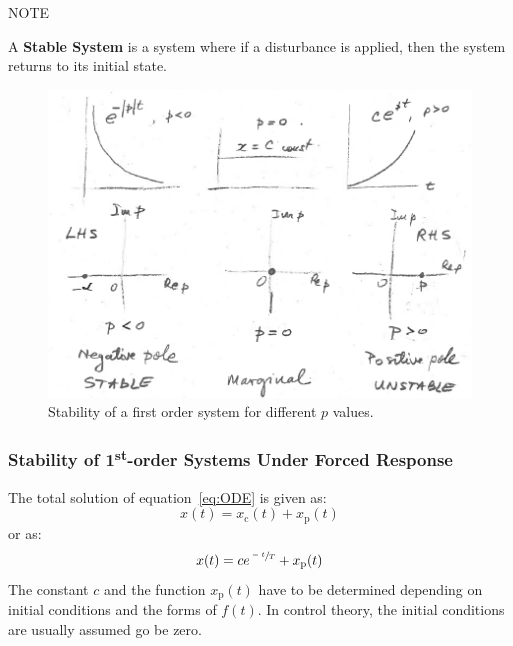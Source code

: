 \documentclass[12pt,letter]{article}
\numberwithin{ex}{section} %
\numberwithin{re}{section} %
\newcommand{\bl}[1]{\textcolor[rgb]{0.00,0.00,1.00}{#1}}
\numberwithin{equation}{section}	%
\begin{document}
\begin{mdframed}[middlelinewidth=0.5mm]
\begin{center}
\bl{NOTE}
\end{center}
A \textbf{Stable System} is a system where if a disturbance is applied, then the system returns to its initial state. 
\end{mdframed}

\begin{figure}[H]
	\centering
	\includegraphics[width=6.5in]{../figures/system_stability_first_order.png}
	\caption{Stability of a first order system for different $p$ values.}
\end{figure}


\subsubsection{Stability of 1\textsuperscript{st}-order Systems Under Forced Response}


The total solution of equation~\ref{eq:ODE} is given as:
\begin{equation}
x(t) = x_\text{c}(t)+x_\text{p}(t)
\end{equation}
or as:
\begin{equation}
x(t) = c e^{ \sfrac{-t}{T}} + x_\text{p}(t)
\end{equation}
The constant $c$ and the function $x_\text{p}(t)$ have to be determined depending on initial conditions and the forms of $f(t)$. In control theory, the initial conditions are usually assumed go be zero. 

\end{document}
